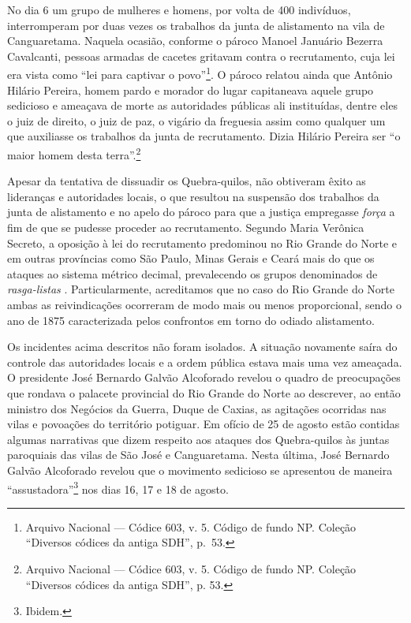\begin{refsection}
No dia 6 um grupo de mulheres e homens, por volta de 400 indivíduos, interromperam por duas vezes os trabalhos da junta de alistamento na vila de Canguaretama. Naquela ocasião, conforme o pároco Manoel Januário Bezerra Cavalcanti, pessoas armadas de cacetes gritavam contra o recrutamento, cuja lei era vista como “lei para captivar o povo”\footnote{Arquivo Nacional --- Códice 603, v. 5. Código de fundo NP. Coleção “Diversos códices da antiga SDH”, p.~53.}. O pároco relatou ainda que Antônio Hilário Pereira, homem pardo e morador do lugar capitaneava aquele grupo sedicioso e ameaçava de morte as autoridades públicas ali instituídas, dentre eles o juiz de direito, o juiz de paz, o vigário da freguesia assim como qualquer um que auxiliasse os trabalhos da junta de recrutamento. Dizia Hilário Pereira ser “o maior homem desta terra”.\footnote{Arquivo Nacional --- Códice 603, v. 5. Código de fundo NP. Coleção “Diversos códices da antiga SDH”, p. 53.}

Apesar da tentativa de dissuadir os Quebra-quilos, não obtiveram êxito as lideranças e autoridades locais, o que resultou na suspensão dos trabalhos da junta de alistamento e no apelo do pároco para que a justiça empregasse \textit{força} a fim de que se pudesse proceder ao recrutamento. Segundo Maria Verônica Secreto, a oposição à lei do recrutamento predominou no Rio Grande do Norte e em outras províncias como São Paulo, Minas Gerais e Ceará mais do que os ataques ao sistema métrico decimal, prevalecendo os grupos denominados de \textit{rasga-listas} \cite[p.~81]{secreto2011medidos}. Particularmente, acreditamos que no caso do Rio Grande do Norte ambas as reivindicações ocorreram de modo mais ou menos proporcional, sendo o ano de 1875 caracterizada pelos confrontos em torno do odiado alistamento. 

Os incidentes acima descritos não foram isolados. A situação novamente saíra do controle das autoridades locais e a ordem pública estava mais uma vez ameaçada. O presidente José Bernardo Galvão Alcoforado revelou o quadro de preocupações que rondava o palacete provincial do Rio Grande do Norte ao descrever, ao então ministro dos Negócios da Guerra, Duque de Caxias, as agitações ocorridas nas vilas e povoações do território potiguar. Em ofício de 25 de agosto estão contidas algumas narrativas que dizem respeito aos ataques dos Quebra-quilos às juntas paroquiais das vilas de São José e Canguaretama. Nesta última, José Bernardo Galvão Alcoforado revelou que o movimento sedicioso se apresentou de maneira “assustadora”\footnote{Ibidem.} nos dias 16, 17 e 18 de agosto.


\end{refsection}
